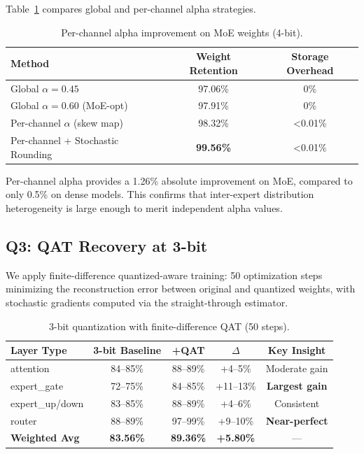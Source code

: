 Table~\ref{tab:perchannel} compares global and per-channel alpha strategies.

\begin{table}[h]
\centering
\caption{Per-channel alpha improvement on MoE weights (4-bit).}
\label{tab:perchannel}
\begin{tabular}{lcc}
\toprule
\textbf{Method} & \textbf{Weight Retention} & \textbf{Storage Overhead} \\
\midrule
Global $\alpha = 0.45$              & 97.06\% & 0\% \\
Global $\alpha = 0.60$ (MoE-opt)    & 97.91\% & 0\% \\
Per-channel $\alpha$ (skew map)     & 98.32\% & <0.01\% \\
Per-channel + Stochastic Rounding  & \textbf{99.56\%} & <0.01\% \\
\bottomrule
\end{tabular}
\end{table}

Per-channel alpha provides a 1.26\% absolute improvement on MoE, compared to only
0.5\% on dense models. This confirms that inter-expert distribution heterogeneity
is large enough to merit independent alpha values.

\subsection{Q3: QAT Recovery at 3-bit}

We apply finite-difference quantized-aware training: 50 optimization steps
minimizing the reconstruction error between original and quantized weights,
with stochastic gradients computed via the straight-through estimator.

\begin{table}[h]
\centering
\caption{3-bit quantization with finite-difference QAT (50 steps).}
\label{tab:qat}
\begin{tabular}{lcccc}
\toprule
\textbf{Layer Type} & \textbf{3-bit Baseline} & \textbf{+QAT} & \textbf{$\Delta$} & \textbf{Key Insight} \\
\midrule
attention          & 84--85\% & 88--89\% & +4--5\%  & Moderate gain \\
expert\_gate       & 72--75\% & 84--85\% & +11--13\% & \textbf{Largest gain} \\
expert\_up/down    & 83--85\% & 88--89\% & +4--6\%  & Consistent \\
router             & 88--89\% & 97--99\% & +9--10\% & \textbf{Near-perfect} \\
\midrule
\textbf{Weighted Avg} & \textbf{83.56\%} & \textbf{89.36\%} & \textbf{+5.80\%} & --- \\
\bottomrule
\end{tabular}
\end{table}

